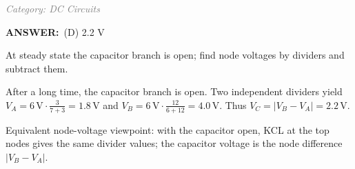 \documentclass[12pt, a4paper]{article}
\makeatletter
\newcommand{\finalanswer}[1]{\textbf{ANSWER:}~#1}
\newif\if@categoryprinted
\newcommand{\category}[1]{\if@categoryprinted\relax\else\textit{\textcolor{gray}{Category: #1}}\global\@categoryprintedtrue\fi}
\makeatother
\begin{document}
\begin{CJK*}{UTF8}{gbsn}
\begin{enumerate}[itemsep=1.0em, topsep=0.6em]
\category{DC Circuits}
\begin{answerbox}
\finalanswer{(D) 2.2 V}
\end{answerbox}
\begin{insightbox}
At steady state the capacitor branch is open; find node voltages by dividers and subtract them.
\end{insightbox}
\begin{solutionbox}

After a long time, the capacitor branch is open. Two independent dividers yield $V_A = 6\,\text{V}\cdot\tfrac{3}{7+3} = 1.8\,\text{V}$ and $V_B = 6\,\text{V}\cdot\tfrac{12}{6+12} = 4.0\,\text{V}$. Thus $V_C = |V_B-V_A| = 2.2\,\text{V}$.
\par\smallskip Equivalent node-voltage viewpoint: with the capacitor open, KCL at the top nodes gives the same divider values; the capacitor voltage is the node difference $|V_B-V_A|$.
\end{solutionbox}


\end{enumerate}
\end{CJK*}
\end{document}
